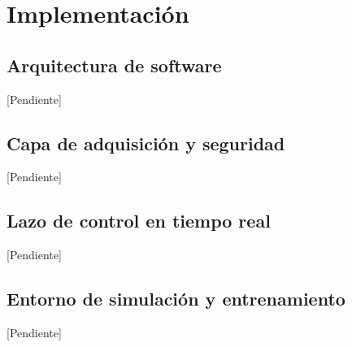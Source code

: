 \chapter{Implementación}
\label{cap:implementacion}

\section{Arquitectura de software}
[Pendiente]

\section{Capa de adquisición y seguridad}
[Pendiente]

\section{Lazo de control en tiempo real}
[Pendiente]

\section{Entorno de simulación y entrenamiento}
[Pendiente]
